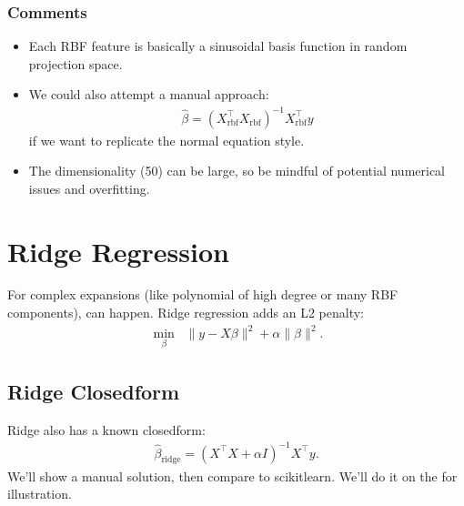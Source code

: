 \documentclass[letterpaper,10pt,english]{jupyterBook}
\begin{document}
\subsubsection{Comments}
\label{\detokenize{02:id1}}\begin{itemize}
\item {} 
\sphinxAtStartPar
Each RBF feature is basically a sinusoidal basis function in random projection space.

\item {} 
\sphinxAtStartPar
We could also attempt a manual approach:
\begin{equation*}
\begin{split}
    \hat{\beta} = (X_{\mathrm{rbf}}^\top X_{\mathrm{rbf}})^{-1} X_{\mathrm{rbf}}^\top y
  \end{split}
\end{equation*}
\sphinxAtStartPar
if we want to replicate the normal equation style.

\item {} 
\sphinxAtStartPar
The dimensionality (50) can be large, so be mindful of potential numerical issues and overfitting.

\end{itemize}


\section{Ridge Regression}
\label{\detokenize{02:ridge-regression}}
\sphinxAtStartPar
For complex expansions (like polynomial of high degree or many RBF components),  can happen.
Ridge regression adds an L2 penalty:
\begin{equation*}
\begin{split}
  \min_{\beta} \;\; \| y - X \beta \|^2 + \alpha \| \beta \|^2.
\end{split}
\end{equation*}

\subsection{Ridge Closed\sphinxhyphen{}form}
\label{\detokenize{02:ridge-closed-form}}
\sphinxAtStartPar
Ridge also has a known closed\sphinxhyphen{}form:
\begin{equation*}
\begin{split}
  \hat{\beta}_{\mathrm{ridge}} = (X^\top X + \alpha I)^{-1} X^\top y.
\end{split}
\end{equation*}
\sphinxAtStartPar
We’ll show a manual solution, then compare to scikit\sphinxhyphen{}learn. We’ll do it on the  for illustration.
\end{document}
